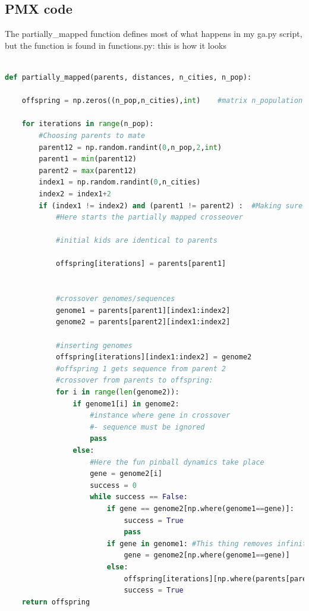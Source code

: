 \documentclass[10pt, a4paper]{article}
\begin{document}
\subsection{PMX code}
The partially\_mapped function defines most of what happens in my ga.py script, but the function is found in functions.py: this is how it looks
\begin{lstlisting}[language = Python]
 
def partially_mapped(parents, distances, n_cities, n_pop):
    
    offspring = np.zeros((n_pop,n_cities),int)    #matrix n_population x n_cities

    for iterations in range(n_pop):
        #Choosing parents to mate
        parent12 = np.random.randint(0,n_pop,2,int)
        parent1 = min(parent12)
        parent2 = max(parent12)
        index1 = np.random.randint(0,n_cities)
        index2 = index1+2
        if (index1 != index2) and (parent1 != parent2) :  #Making sure parents are different and -
            #Here starts the partially mapped crosseover

            #initial kids are identical to parents

            offspring[iterations] = parents[parent1]


            #crossover genomes/sequences
            genome1 = parents[parent1][index1:index2]
            genome2 = parents[parent2][index1:index2]

            #inserting genomes
            offspring[iterations][index1:index2] = genome2 
            #offspring 1 gets sequence from parent 2
            #crossover from parents to offspring:
            for i in range(len(genome2)):
                if genome1[i] in genome2: 
                    #instance where gene in crossover 
                    #- sequence must be ignored
                    pass
                else:
                    #Here the fun pinball dynamics take place
                    gene = genome2[i]
                    success = 0
                    while success == False:
                        if gene == genome2[np.where(genome1==gene)]:
                            success = True
                            pass
                        if gene in genome1: #This thing removes infinite loops
                            gene = genome2[np.where(genome1==gene)]
                        else:
                            offspring[iterations][np.where(parents[parent1]==gene)] = genome1[i]
                            success = True
    return offspring
    \end{lstlisting}
\end{document}
